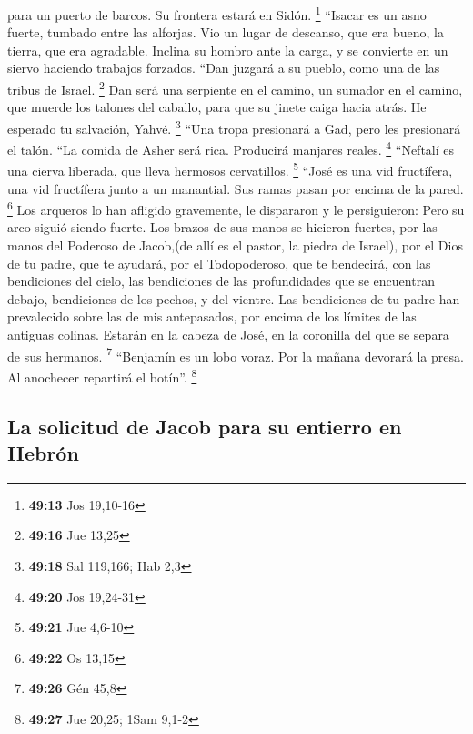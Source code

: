 para un puerto de barcos. Su frontera estará en Sidón. \footnote{\textbf{49:13}
  Jos 19,10-16}  ``Isacar es un asno fuerte, tumbado
entre las alforjas.  Vio un lugar de descanso, que era
bueno, la tierra, que era agradable. Inclina su hombro ante la carga, y
se convierte en un siervo haciendo trabajos forzados. 
``Dan juzgará a su pueblo, como una de las tribus de Israel. \footnote{\textbf{49:16}
  Jue 13,25}  Dan será una serpiente en el camino, un
sumador en el camino, que muerde los talones del caballo, para que su
jinete caiga hacia atrás.  He esperado tu salvación,
Yahvé. \footnote{\textbf{49:18} Sal 119,166; Hab 2,3} 
``Una tropa presionará a Gad, pero les presionará el talón.
 ``La comida de Asher será rica. Producirá manjares
reales. \footnote{\textbf{49:20} Jos 19,24-31}  ``Neftalí
es una cierva liberada, que lleva hermosos cervatillos. \footnote{\textbf{49:21}
  Jue 4,6-10}  ``José es una vid fructífera, una vid
fructífera junto a un manantial. Sus ramas pasan por encima de la pared.
\footnote{\textbf{49:22} Os 13,15}  Los arqueros lo han
afligido gravemente, le dispararon y le persiguieron: 
Pero su arco siguió siendo fuerte. Los brazos de sus manos se hicieron
fuertes, por las manos del Poderoso de Jacob,(de allí es el pastor, la
piedra de Israel),  por el Dios de tu padre, que te
ayudará, por el Todopoderoso, que te bendecirá, con las bendiciones del
cielo, las bendiciones de las profundidades que se encuentran debajo,
bendiciones de los pechos, y del vientre.  Las
bendiciones de tu padre han prevalecido sobre las de mis antepasados,
por encima de los límites de las antiguas colinas. Estarán en la cabeza
de José, en la coronilla del que se separa de sus hermanos. \footnote{\textbf{49:26}
  Gén 45,8}  ``Benjamín es un lobo voraz. Por la mañana
devorará la presa. Al anochecer repartirá el botín''. \footnote{\textbf{49:27}
  Jue 20,25; 1Sam 9,1-2}

\hypertarget{la-solicitud-de-jacob-para-su-entierro-en-hebruxf3n}{%
\subsection{La solicitud de Jacob para su entierro en
Hebrón}\label{la-solicitud-de-jacob-para-su-entierro-en-hebruxf3n}}

